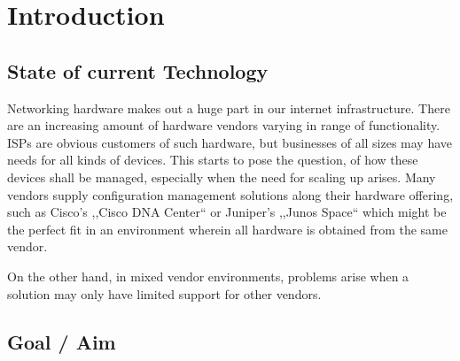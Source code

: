 \chapter{\label{introduction}Introduction}
\thispagestyle{fancy}


\section{\label{introduction-current}State of current Technology}

Networking hardware makes out a huge part in our internet infrastructure. 
There are an increasing amount of hardware vendors varying in range of functionality. 
\glspl{ISP} are obvious customers of such hardware, but businesses of all sizes may have needs for all kinds of devices. 
This starts to pose the question, of how these devices shall be managed, especially when the need for scaling up arises. 
Many vendors supply configuration management solutions along their hardware offering, 
such as Cisco's ,,Cisco DNA Center``\cite{noauthor_cisco_nodate} or Juniper's ,,Junos Space``\cite{noauthor_junos_nodate} 
which might be the perfect fit in an environment wherein all hardware is obtained from the same vendor.

On the other hand, in mixed vendor environments, problems arise when a solution may only have limited support for other vendors.


\section{\label{introduction-goal}Goal / Aim}







